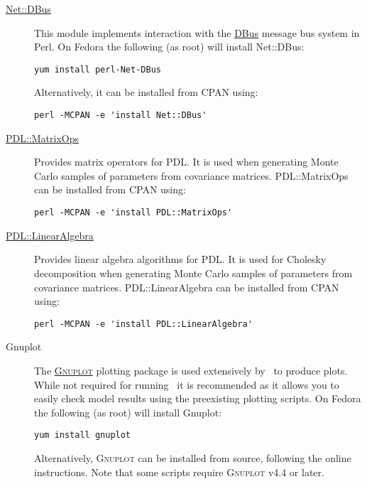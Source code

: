 \begin{description}
  \item [\href{http://search.cpan.org/~danberr/Net-DBus-0.33.6/lib/Net/DBus.pm}{{\normalfont \ttfamily Net::DBus}}] This module implements interaction with the \href{http://www.freedesktop.org/wiki/Software/dbus}{DBus} message bus system in Perl. On Fedora the following (as root) will install {\normalfont \ttfamily Net::DBus}:
\begin{verbatim}
yum install perl-Net-DBus
\end{verbatim}
Alternatively, it can be installed from CPAN using:
\begin{verbatim}
perl -MCPAN -e 'install Net::DBus'
\end{verbatim}

  \item [\href{http://search.cpan.org/~chm/PDL-2.4.7/Basic/MatrixOps/matrixops.pd}{{\normalfont \ttfamily PDL::MatrixOps}}] Provides matrix operators for PDL. It is used when generating Monte Carlo samples of parameters from covariance matrices. {\normalfont \ttfamily PDL::MatrixOps} can be installed from CPAN using:
\begin{verbatim}
perl -MCPAN -e 'install PDL::MatrixOps'
\end{verbatim}
  \item [\href{http://search.cpan.org/~ellipse/PDL-LinearAlgebra-0.06/LinearAlgebra.pm}{{\normalfont \ttfamily PDL::LinearAlgebra}}] Provides linear algebra algorithms for PDL. It is used for Cholesky decomposition when generating Monte Carlo samples of parameters from covariance matrices. {\normalfont \ttfamily PDL::LinearAlgebra} can be installed from CPAN using:
\begin{verbatim}
perl -MCPAN -e 'install PDL::LinearAlgebra'
\end{verbatim}

\item[Gnuplot] The \href{http://www.gnuplot.info/}{\normalfont \scshape Gnuplot} plotting package is used extensively by \glc\ to produce plots. While not required for running \glc\ it is recommended as it allows you to easily check model results using the preexisting plotting scripts. On Fedora the following (as root) will install {\normalfont \ttfamily Gnuplot}:
\begin{verbatim}
yum install gnuplot
\end{verbatim}
Alternatively, {\normalfont \scshape Gnuplot} can be installed from source, following the online instructions. Note that some scripts require {\normalfont \scshape Gnuplot} v4.4 or later.


\end{description}
